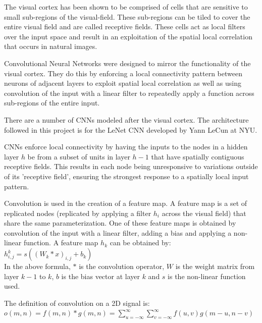 \documentclass[12pt, titlepage]{article}
\begin{document}
  The visual cortex has been shown to be comprised of cells that are sensitive to small sub-regions of the visual-field. These
  sub-regions can be tiled to cover the entire visual field and are called receptive fields. These cells act as local filters
  over the input space and result in an exploitation of the spatial local correlation that occurs in natural images.
  
  Convolutional Neural Networks were designed to mirror the functionality of the visual cortex. They do this by enforcing a
  local connectivity pattern between neurons of adjacent layers to exploit spatial local correlation as well as using
  convolution of the input with a linear filter to repeatedly apply a function across sub-regions of the entire input.
  
  There are a number of CNNs modeled after the visual cortex. The architecture followed in this project is for the LeNet CNN
  developed by Yann LeCun at NYU.
  
  CNNs enforce local connectivity by having the inputs to the nodes in a hidden layer $h$ be from a subset of units in layer
  $h-1$ that have spatially contiguous receptive fields. This results in each node being unresponsive to variations outside
  of its 'receptive field', ensuring the strongest response to a spatially local input pattern.
  
  Convolution is used in the creation of a feature map. A feature map is a set of replicated nodes (replicated by applying a
  filter $h_{i}$ across the visual field) that share the same parameterization. One of these feature maps is obtained by
  convolution of the input with a linear filter, adding a bias and applying a non-linear function. A feature map $h_{k}$ can
  be obtained by: \\
  \vspace{2mm}
  \hspace{7mm}$h_{i,j}^{k} = s((W_{k} \ast x)_{i,j} + b_{k})$ \\
  In the above formula, $\ast$ is the convolution operator, $W$ is the weight matrix from layer $k-1$ to $k$, $b$ is the bias
  vector at layer $k$ and $s$ is the non-linear function used.
  
  The definition of convolution on a 2D signal is: \\
  \vspace{2mm}
  \hspace{7mm}$o(m,n) = f(m,n) \ast g(m,n) = \sum_{u=-\infty}^{\infty} \sum_{v=-\infty}^{\infty} f(u,v)g(m - u,n - v)$\\
  
\end{document}
